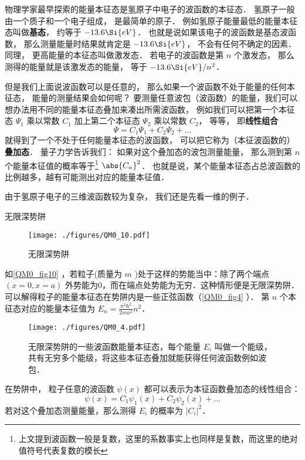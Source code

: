 物理学家最早探索的能量本征态是氢原子中电子的波函数的本征态． 氢原子一般由一个质子和一个电子组成， 是最简单的原子． 例如氢原子能量最低的能量本征态叫做\textbf{基态}， 约等于 $-13.6\Si{eV}$． 也就是说如果该电子的波函数是基态波函数， 那么测量能量时结果就肯定是 $-13.6\Si{eV}$， 不会有任何不确定的因素． 同理， 更高能量的本征态叫做激发态． 若电子的波函数是第 $n$ 个激发态， 那么测得的能量就是该激发态的能量， 等于 $-13.6\Si{eV}/n^2$．

但是我们上面说波函数可以是任意的， 那么如果一个波函数不处于能量的任何本征态， 能量的测量结果会如何呢？ 要测量任意波包（波函数）的能量，我们可以想办法用不同的能量本征态叠加来凑出所需波函数， 例如我们可以把第一个本征态 $\Psi_1$ 乘以常数 $C_1$ 加上第二个本征态 $\Psi_2$ 乘以常数 $C_2$， 等等， 即\textbf{线性组合}
\begin{equation}
\Psi = C_1\Psi_1 + C_2\Psi_2 + \dots
\end{equation}
就得到了一个不处于任何能量本征态的波函数， 可以把它称为（本征波函数的）\textbf{叠加态}． 量子力学告诉我们： 如果对这个叠加态的波包测量能量， 那么测到第 $n$ 个能量本征值的概率等于\footnote{上文提到波函数一般是复数，这里的系数事实上也同样是复数，而这里的绝对值符号代表复数的模长} $\abs{C_n}^2$． 也就是说，某个能量本征态占总波函数的比例越多，越有可能测出对应的能量本征值．

由于氢原子电子的三维波函数较为复杂， 我们还是先看一维的例子．

\begin{example}{无限深势阱}
\begin{figure}[ht]
\centering
\texttt{[image: ./figures/QM0\_10.pdf]}
\caption{无限深势阱} \label{QM0_fig10}
\end{figure}
如\autoref{QM0_fig10} ，若粒子(质量为 $m$ )处于这样的势能当中：除了两个端点 $(x=0,x=a)$ 外势能为0，而在端点处势能为无穷．这种情形便是无限深势阱． 可以解得粒子的能量本征态在势阱内是一些正弦函数（\autoref{QM0_fig4} ）． 第 $n$ 个本征态对应的能量本征值为 $E_n=\frac{\pi^2\hbar^2}{2ma^2}n^2$．

\begin{figure}[ht]
\centering
\texttt{[image: ./figures/QM0\_4.pdf]}
\caption{无限深势阱的一些波函数能量本征态，每个能量 $E_i$ 叫做一个能级，共有无穷多个能级，将这些本征态叠加就能获得任何波函数例如波包．} \label{QM0_fig4}
\end{figure}

在势阱中， 粒子任意的波函数 $\psi(x)$ 都可以表示为本征函数叠加态的线性组合：
\begin{equation}
\psi(x) = C_1\psi_1(x) + C_2\psi_2(x) + \dots
\end{equation}
若对这个叠加态测量能量，那么测得 $E_i$ 的概率为 $|C_i|^2$．
\end{example}


